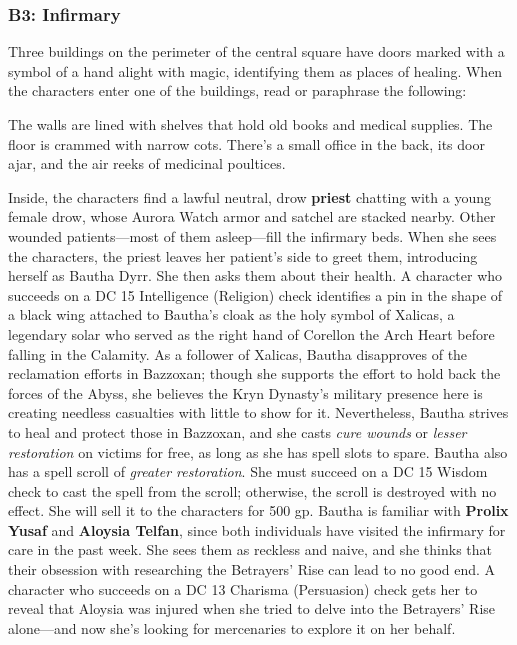 \documentclass[10pt,a4,twoside,twocolumn,openany,nodeprecatedcode]{dndbook}
\begin{document}
\subsubsection{B3: Infirmary}
Three buildings on the perimeter of the central square have doors marked with a symbol of a hand alight with magic, identifying them as places of healing. When the characters enter one of the buildings, read or paraphrase the following:
\begin{DndReadAloud}{}
The walls are lined with shelves that hold old books and medical supplies. The floor is crammed with narrow cots. There's a small office in the back, its door ajar, and the air reeks of medicinal poultices.
\end{DndReadAloud}

Inside, the characters find a lawful neutral, drow \textbf{priest} chatting with a young female drow, whose Aurora Watch armor and satchel are stacked nearby. Other wounded patients—most of them asleep—fill the infirmary beds.
When she sees the characters, the priest leaves her patient's side to greet them, introducing herself as Bautha Dyrr. She then asks them about their health. A character who succeeds on a DC 15 Intelligence (Religion) check identifies a pin in the shape of a black wing attached to Bautha's cloak as the holy symbol of Xalicas, a legendary solar who served as the right hand of Corellon the Arch Heart before falling in the Calamity. As a follower of Xalicas, Bautha disapproves of the reclamation efforts in Bazzoxan; though she supports the effort to hold back the forces of the Abyss, she believes the Kryn Dynasty's military presence here is creating needless casualties with little to show for it. Nevertheless, Bautha strives to heal and protect those in Bazzoxan, and she casts \textit{cure wounds} or \textit{lesser restoration} on victims for free, as long as she has spell slots to spare.
Bautha also has a spell scroll of \textit{greater restoration}. She must succeed on a DC 15 Wisdom check to cast the spell from the scroll; otherwise, the scroll is destroyed with no effect. She will sell it to the characters for 500 gp.
Bautha is familiar with \textbf{Prolix Yusaf} and \textbf{Aloysia Telfan}, since both individuals have visited the infirmary for care in the past week. She sees them as reckless and naive, and she thinks that their obsession with researching the Betrayers' Rise can lead to no good end. A character who succeeds on a DC 13 Charisma (Persuasion) check gets her to reveal that Aloysia was injured when she tried to delve into the Betrayers' Rise alone—and now she's looking for mercenaries to explore it on her behalf.
\end{document}
